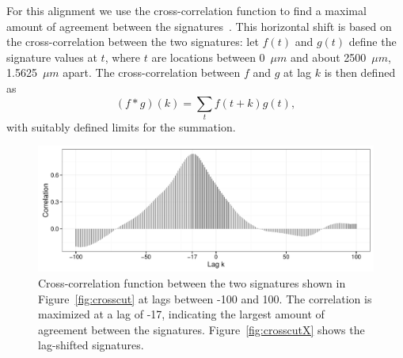 \documentclass[aoas, preprint]{imsart}\usepackage[]{graphicx}\usepackage[]{color}
\newenvironment{knitrout}{}{} %
\begin{document}
%
For this alignment we use the cross-correlation function to find a maximal amount of agreement between the signatures~\cite{bachrach:2002, chu:2010, vorburger:2011, thompson:2013}.
This horizontal shift is based on the cross-correlation between the two signatures: let $f(t)$ and $g(t)$ define the signature values  at $t$, where $t$ are locations between 0~$\mu m$ and about 2500~$\mu m$, 1.5625~$\mu m$ apart.
The cross-correlation between $f$ and $g$ at lag $k$ is then defined as
\[
(f * g) (k) = \sum_t f(t+k) g(t),
\]
with suitably defined limits for the summation. %

\begin{figure}[hbtp]
  \centering
\begin{knitrout}
\color{fgcolor}
\includegraphics[width=.65\textwidth]{ccf-1} 

\end{knitrout}
\caption{\label{fig:ccf}Cross-correlation function between the two signatures shown in Figure~\ref{fig:crosscut} at lags between -100 and 100. The correlation is maximized at a lag of -17, indicating the largest amount of agreement between the signatures. Figure~\ref{fig:crosscutX} shows the lag-shifted signatures.}
\end{figure}
\end{document}
